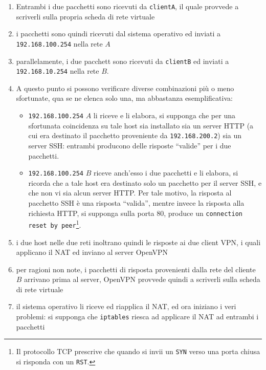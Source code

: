 \begin{enumerate}
{  davvero in un caso come questo, né lo si è verificato in pratica perché ci si è
  piuttosto concentrati sulla soluzione di tale probelma.}) che entrambi i due pacchetti
  siano inviato ad entrambi i due client.
  \item Entrambi i due pacchetti sono ricevuti da \texttt{clientA}, il quale provvede
  a scriverli sulla propria scheda di rete virtuale
  \item i pacchetti sono quindi ricevuti dal sistema operativo ed inviati a
  \texttt{192.168.100.254} nella rete $A$
  \item parallelamente, i due pacchett sono ricevuti da \texttt{clientB} ed inviati a
  \texttt{192.168.10.254} nella rete $B$.
  \item A questo punto si possono verificare diverse combinazioni più o meno
  sfortunate, qua se ne elenca solo una, ma abbastanza esemplificativa:
  \begin{itemize}
    \item \texttt{192.168.100.254} $A$ li riceve e li elabora, si supponga che per una sfortunata
    coincidenza su tale host sia installato sia un server HTTP (a cui era destinato il
    pacchetto proveniente da \texttt{192.168.200.2}) sia un server SSH: entrambi
    producono delle risposte ``valide'' per i due pacchetti.
    \item \texttt{192.168.100.254} $B$ riceve anch'esso i due pacchetti e li elabora, si ricorda
    che a tale host era destinato solo un pacchetto per il server SSH, e che non vi
    sia alcun server HTTP. Per tale motivo, la risposta al pacchetto SSH è una
    risposta ``valida'', mentre invece la risposta alla richiesta HTTP, si supponga
    sulla porta 80, produce un \texttt{connection reset by peer}\footnote{Il protocollo TCP
    prescrive che quando si invii un \texttt{SYN} verso una porta chiusa si risponda
    con un \texttt{RST}.}.
  \end{itemize}
  \item i due host nelle due reti inoltrano quindi le risposte ai due client VPN, i quali
  applicano il NAT ed inviano al server OpenVPN
  \item per ragioni non note, i pacchetti di risposta provenienti dalla rete del cliente $B$
  arrivano prima al server, OpenVPN provvede quindi a scriverli sulla scheda di rete
  virtuale
  \item il sistema operativo li riceve ed riapplica il NAT, ed ora iniziano i veri problemi:
  si supponga che \texttt{iptables} riesca ad applicare il NAT ad entrambi i pacchetti

\end{enumerate}
